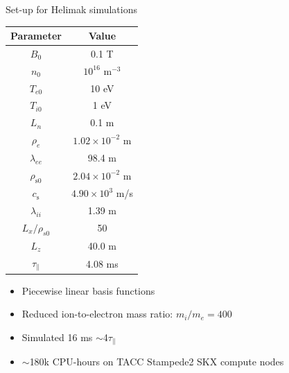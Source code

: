 \documentclass[12pt,table]{beamer}
\begin{document}
\begin{frame}{Set-up for Helimak simulations}%
\begin{minipage}{0.48\linewidth}
\footnotesize
    \centering
    \begin{tabular}{c|c}
    \textbf{Parameter} & \textbf{Value} \\ \hline
    $B_0$ & 0.1 T \\
    $n_0$ & $10^{16}$ m$^{-3}$\\
    $T_{e0}$ & 10 eV\\
    $T_{i0}$ & 1 eV\\
    $L_n$ & 0.1 m \\
    $\rho_e$ & $1.02 \times 10^{-2}$ m \\
    $\lambda_{ee}$ & 98.4 m \\
    $\rho_{\mathrm{s}0}$ & $2.04 \times 10^{-2}$ m \\
    $c_\mathrm{s}$ & $4.90 \times 10^{3}$ m/s \\
    $\lambda_{ii}$ & 1.39 m \\
    $L_x/\rho_{s0} $ & 50 \\
    $L_z$ & 40.0 m \\
    $\tau_\parallel$ & 4.08 ms 
	\end{tabular}
\end{minipage}%
\begin{minipage}{0.48\linewidth}
\vspace{.25cm}
\begin{itemize}
\footnotesize
    \item Piecewise linear basis functions
    \item Reduced ion-to-electron mass ratio: $m_i/m_e = 400$
    \item Simulated 16 ms $\sim$4$\tau_\parallel$ 
    \item $\sim$180k CPU-hours on TACC Stampede2 SKX compute nodes
\end{itemize}
\end{minipage}
\end{frame}
\end{document}

